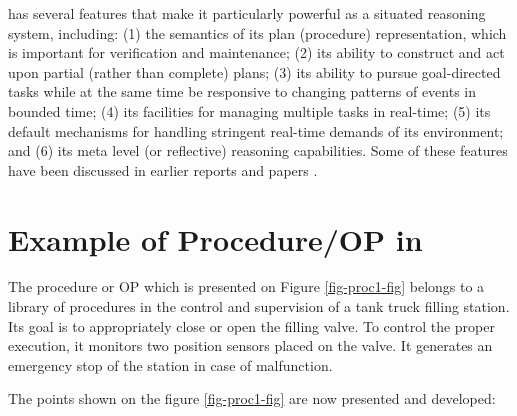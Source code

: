 \COPRS{} has several features that make it particularly powerful as a
situated reasoning system, including: (1) the semantics of its plan (procedure)
representation, which is important for verification and maintenance; (2) its
ability to construct and act upon partial (rather than complete) plans; (3) its
ability to pursue goal-directed tasks while at the same time be responsive
to changing patterns of events in bounded time; (4) its facilities for managing
multiple tasks in real-time; (5) its default mechanisms for handling stringent
real-time demands of its environment; and (6) its meta level (or reflective)
reasoning capabilities. Some of these features have been discussed in earlier
reports and papers
\cite{Georgeff-Ingrand89,Georgeff-Ingrand90-b,Georgeff-Ingrand90-a}.

\section{Example of Procedure/OP in \COPRS{}}

The procedure or OP which is presented on Figure \ref{fig-proc1-fig}
belongs to a library of procedures in the control and supervision of a tank
truck filling station. Its goal is to appropriately close or open the filling
valve. To control the proper execution, it monitors two position sensors placed
on the valve. It generates an emergency stop of the
station in case of malfunction.


The points shown on the figure \ref{fig-proc1-fig} are now presented and
developed:

